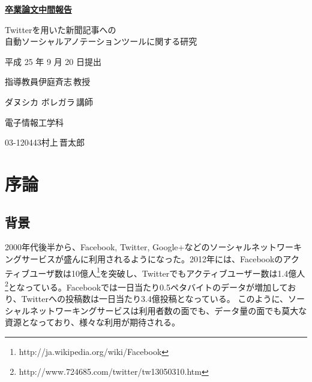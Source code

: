 \documentclass[12pt]{jarticle}
\begin{document}
\pagestyle{empty}
\begin{center}
  \vspace*{3.0cm}
  \underline{\bf{\fontsize{50pt}{100pt}\selectfont 卒業論文中間報告}}

  \vspace*{2.0cm}
  \begin{LARGE}
    Twitterを用いた新聞記事への\\
    自動ソーシャルアノテーションツールに関する研究
    \vspace*{2.0cm}

    平成 25 年 9 月 20 日提出
  \end{LARGE}

\end{center}
\begin{LARGE}
  \vspace*{1.0cm}
  \hspace{25mm}指導教員\hspace{51mm}伊庭斉志\,教授

  \hspace{70mm}ダヌシカ ボレガラ\,講師

  \vspace*{1.0cm}
  \begin{center}
    電子情報工学科

    \vspace{1.0cm}
    03-120443\hspace{15mm}村上\,晋太郎
  \end{center}

\end{LARGE}


\newpage
\tableofcontents

\newpage
\setcounter{page}{1}
\pagestyle{plain}

\section{序論}
\subsection{背景}
2000年代後半から、Facebook, Twitter, Google+などのソーシャルネットワーキングサービスが盛んに利用されるようになった。2012年には、Facebookのアクティブユーザ数は10億人\footnote{http://ja.wikipedia.org/wiki/Facebook}を突破し、Twitterでもアクティブユーザー数は1.4億人\footnote{http://www.724685.com/twitter/tw13050310.htm}となっている。Facebookでは一日当たり0.5ペタバイトのデータが増加しており、Twitterへの投稿数は一日当たり3.4億投稿となっている。
このように、ソーシャルネットワーキングサービスは利用者数の面でも、データ量の面でも莫大な資源となっており、様々な利用が期待される。
\end{document}

